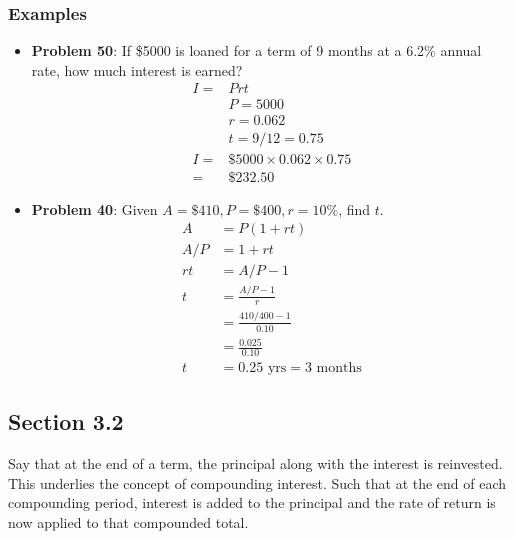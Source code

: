 \documentclass[14pt]{extarticle}
\begin{document}
\subsubsection*{Examples}
\begin{itemize}
	\item \textbf{Problem 50}: If \$5000 is loaned for a term of 9 months at a 6.2\% annual rate, how much interest is earned?
	\begin{align*}
		I= &Prt \\
		&P = 5000 \\
		&r = 0.062 \\
		&t = 9/12 = 0.75 \\
		I =& \$5000 \times 0.062 \times 0.75 \\
		= &  \$232.50
	\end{align*}
	\item \textbf{Problem 40}: Given $A = \$410, P = \$400, r=10\%$, find $t$.
	\begin{align*}
		A &= P(1+rt) \\
		A/P &= 1+ rt \\
		rt & = A/P - 1 \\
		t &= \frac{A/P - 1}{r} \\
		&= \frac{410/400 - 1}{0.10} \\
		&= \frac{0.025}{0.10} \\
		t &= 0.25 \text{ yrs} = 3 \text{ months}
	\end{align*}
\end{itemize}

\subsection{Section 3.2}
Say that at the end of a term, the principal along with the interest is reinvested. This underlies the concept of compounding interest. Such that at the end of each compounding period, interest is added to the principal and the rate of return is now applied to that compounded total.
\end{document}
